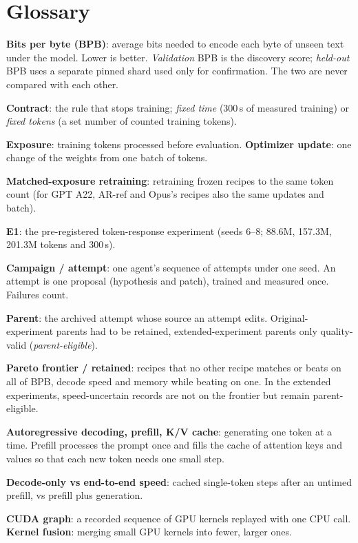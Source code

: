 \documentclass{article}
\newif\ifshowhumanmarkers \showhumanmarkersfalse
\newcommand{\humantag}[1]{{\color{humanframe}\sffamily\scriptsize\bfseries HUMAN AUTHOR MUST REWRITE/VERIFY [#1]}\ }
\newcommand{\humanauthor}[2][]{\ifshowhumanmarkers\begin{humanbox}\humantag{#1}#2\end{humanbox}\else #2\par\fi}
\begin{document}
\section{Glossary}\label{app:glossary}
\humanauthor[P2-01 Glossary]{\textbf{Bits per byte (BPB)}: average bits needed to encode each byte of unseen text under the model. Lower is better. \emph{Validation} BPB is the discovery score; \emph{held-out} BPB uses a separate pinned shard used only for confirmation. The two are never compared with each other.\par
\textbf{Contract}: the rule that stops training; \emph{fixed time} (300\,s of measured training) or \emph{fixed tokens} (a set number of counted training tokens).\par
\textbf{Exposure}: training tokens processed before evaluation. \textbf{Optimizer update}: one change of the weights from one batch of tokens.\par
\textbf{Matched-exposure retraining}: retraining frozen recipes to the same token count (for GPT A22, AR-ref and Opus's recipes also the same updates and batch).\par
\textbf{E1}: the pre-registered token-response experiment (seeds 6--8; 88.6M, 157.3M, 201.3M tokens and 300\,s).\par
\textbf{Campaign / attempt}: one agent's sequence of attempts under one seed. An attempt is one proposal (hypothesis and patch), trained and measured once. Failures count.\par
\textbf{Parent}: the archived attempt whose source an attempt edits. Original-experiment parents had to be retained, extended-experiment parents only quality-valid (\emph{parent-eligible}).\par
\textbf{Pareto frontier / retained}: recipes that no other recipe matches or beats on all of BPB, decode speed and memory while beating on one. In the extended experiments, speed-uncertain records are not on the frontier but remain parent-eligible.\par
\textbf{Autoregressive decoding, prefill, K/V cache}: generating one token at a time. Prefill processes the prompt once and fills the cache of attention keys and values so that each new token needs one small step.\par
\textbf{Decode-only vs end-to-end speed}: cached single-token steps after an untimed prefill, vs prefill plus generation.\par
\textbf{CUDA graph}: a recorded sequence of GPU kernels replayed with one CPU call. \textbf{Kernel fusion}: merging small GPU kernels into fewer, larger ones.\par
}
\end{document}
